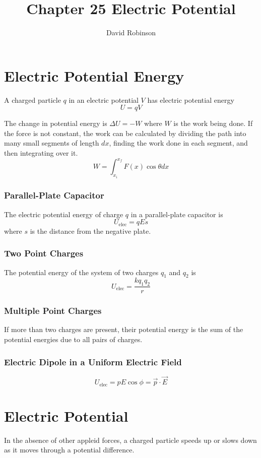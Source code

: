 \documentclass{article}
\title{Chapter 25 Electric Potential}
\author{David Robinson}
\date{}
\begin{document}
\maketitle

\section*{Electric Potential Energy}
A charged particle $q$ in an electric potential $V$ has electric potential energy \[U=qV\]

The change in potential energy is $\Delta U=-W$ where $W$ is the work being done. If the force is
not constant, the work can be calculated by dividing the path into many small segments of length
$dx$, finding the work done in each segment, and then integrating over it.
\[W=\int_{x_i}^{x_f}F(x)\cos\theta dx\]

\subsubsection*{Parallel-Plate Capacitor}
The electric potential energy of charge $q$ in a parallel-plate capacitor is
\[U_\text{elec}=qEs\] where $s$ is the distance from the negative plate.

\subsubsection*{Two Point Charges}
The potential energy of the system of two charges $q_1$ and $q_2$ is
\[U_\text{elec}=\frac{kq_1 q_2}{r}\]

\subsubsection*{Multiple Point Charges}
If more than two charges are present, their potential energy is the sum of the potential energies
due to all pairs of charges.

\subsubsection*{Electric Dipole in a Uniform Electric Field}
\[U_\text{elec}=pE\cos\phi=\vec{p}\cdot \vec{E}\]

\section*{Electric Potential}
In the absence of other appleid forces, a charged particle speeds up or slows down as it moves
through a potential difference. 
\end{document}
